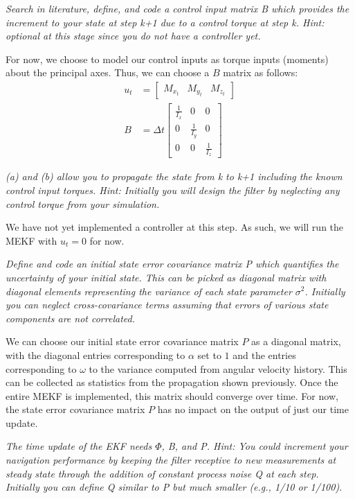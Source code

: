\textit{Search in literature, define, and code a control input matrix B which provides the increment to your state at step k+1 due to a control torque at step k. Hint: optional at this stage since you do not have a controller yet.}

For now, we choose to model our control inputs as torque inputs (moments) about the principal axes. Thus, we can choose a $B$ matrix as follows:
\begin{align*}
    u_{t} &= \begin{bmatrix}
        M_{x_{t}} & M_{y_{t}} & M_{z_{t}}
    \end{bmatrix} \\
    B &= \Delta t \begin{bmatrix}
        \frac{1}{I_{x}} & 0 & 0 \\
        0 & \frac{1}{I_{y}} & 0 \\
        0 & 0 & \frac{1}{I_{z}}
    \end{bmatrix}
\end{align*}

\textit{(a) and (b) allow you to propagate the state from k to k+1 including the known control input torques. Hint: Initially you will design the filter by neglecting any control torque from your simulation.}

We have not yet implemented a controller at this step. As such, we will run the MEKF with $u_{t} = 0$ for now.

\textit{Define and code an initial state error covariance matrix P which quantifies the uncertainty of your initial state. This can be picked as diagonal matrix with diagonal elements representing the variance of each state parameter $\sigma^{2}$. Initially you can neglect cross-covariance terms assuming that errors of various state components are not correlated.}

We can choose our initial state error covariance matrix $P$ as a diagonal matrix, with the diagonal entries corresponding to $\alpha$ set to $1$ and the entries corresponding to $\omega$ to the variance computed from angular velocity history. This can be collected as statistics from the propagation shown previously. Once the entire MEKF is implemented, this matrix should converge over time. For now, the state error covariance matrix $P$ has no impact on the output of just our time update.

\textit{The time update of the EKF needs $\Phi$, B, and P. Hint: You could increment your navigation performance by keeping the filter receptive to new measurements at steady state through the addition of constant process noise Q at each step. Initially you can define Q similar to P but much smaller (e.g., 1/10 or 1/100).}

